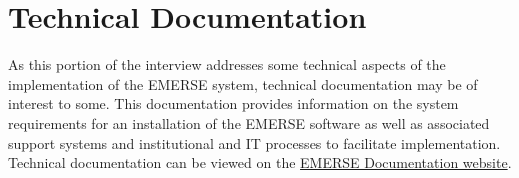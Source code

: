 \section{Technical Documentation}
As this portion of the interview addresses some technical aspects of the implementation of the EMERSE system, technical documentation may be of interest to some. This documentation provides information on the system requirements for an installation of the EMERSE software as well as associated support systems and institutional and IT processes to facilitate implementation. Technical documentation can be viewed on the  \hyperlink{https://project-emerse.org/documentation/index.html}{EMERSE Documentation website}\cite{emerse_documentation}.

